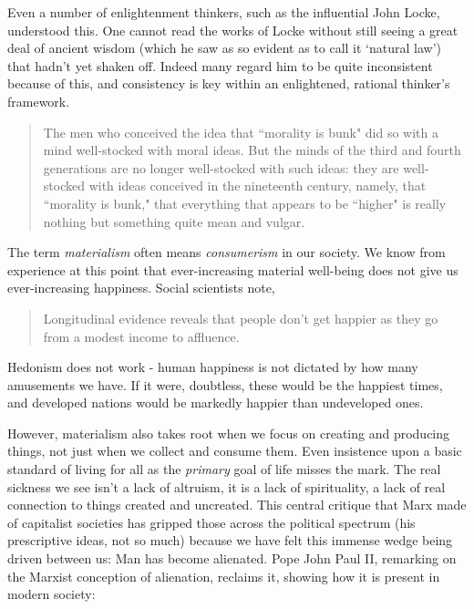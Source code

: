 \documentclass[letterpaper]{article}
\begin{document}
Even a number of enlightenment thinkers, such as the influential John Locke, understood this. One cannot read the works of Locke without still seeing a great deal of ancient wisdom (which he saw as so evident as to call it `natural law') that hadn't yet shaken off. Indeed many regard him to be quite inconsistent because of this, and consistency is key within an enlightened, rational thinker's framework.

\begin{quote}
  The men who conceived the idea that ``morality is bunk" did so with a mind well-stocked with moral ideas. But the minds of the third and fourth generations are no longer well-stocked with such ideas: they are well-stocked with ideas conceived in the nineteenth century, namely, that ``morality is bunk," that everything that appears to be ``higher" is really nothing but something quite mean and vulgar.
\end{quote}

The term \textit{materialism} often means \textit{consumerism} in our society. We know from experience at this point that ever-increasing material well-being does not give us ever-increasing happiness. Social scientists note,

\begin{quote}
  Longitudinal evidence reveals that people don't get happier as they go from a modest income to affluence.
\end{quote}

Hedonism does not work - human happiness is not dictated by how many amusements we have. If it were, doubtless, these would be the happiest times, and developed nations would be markedly happier than undeveloped ones.

However, materialism also takes root when we focus on creating and producing things, not just when we collect and consume them. Even insistence upon a basic standard of living for all as the \textit{primary} goal of life misses the mark. The real sickness we see isn't a lack of altruism, it is a lack of spirituality, a lack of real connection to things created and uncreated. This central critique that Marx made of capitalist societies has gripped those across the political spectrum (his prescriptive ideas, not so much) because we have felt this immense wedge being driven between us: Man has become alienated. Pope John Paul II, remarking on the Marxist conception of alienation, reclaims it, showing how it is present in modern society:
\end{document}
